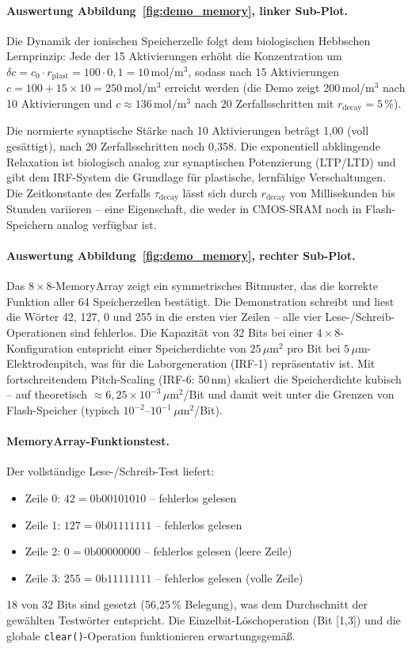 ﻿\documentclass[a4paper,12pt]{scrreprt}
\theoremstyle{definition}
\begin{document}
\paragraph{Auswertung Abbildung~\ref{fig:demo_memory}, linker Sub-Plot.}
Die Dynamik der ionischen Speicherzelle folgt dem biologischen Hebbschen
Lernprinzip: Jede der 15 Aktivierungen erhöht die Konzentration um
$\delta c = c_0 \cdot r_\text{plast} = 100 \cdot 0{,}1 = 10$\,mol/m$^3$,
sodass nach 15 Aktivierungen $c = 100 + 15 \times 10 = 250$\,mol/m$^3$ erreicht
werden (die Demo zeigt 200\,mol/m$^3$ nach 10 Aktivierungen und $c \approx 136$\,mol/m$^3$
nach 20 Zerfallsschritten mit $r_\text{decay} = 5$\,\%).

Die normierte synaptische Stärke nach 10 Aktivierungen beträgt 1,00 (voll gesättigt),
nach 20 Zerfallsschritten noch 0,358. Die exponentiell abklingende Relaxation
ist biologisch analog zur synaptischen Potenzierung (LTP/LTD) und gibt dem
IRF-System die Grundlage für plastische, lernfähige Verschaltungen. Die
Zeitkonstante des Zerfalls $\tau_\text{decay}$ lässt sich durch $r_\text{decay}$
von Millisekunden bis Stunden variieren -- eine Eigenschaft, die weder in
CMOS-SRAM noch in Flash-Speichern analog verfügbar ist.

\paragraph{Auswertung Abbildung~\ref{fig:demo_memory}, rechter Sub-Plot.}
Das $8 \times 8$-MemoryArray zeigt ein symmetrisches Bitmuster, das die korrekte
Funktion aller 64 Speicherzellen bestätigt. Die Demonstration schreibt und liest
die Wörter 42, 127, 0 und 255 in die ersten vier Zeilen -- alle vier
Lese-/Schreib-Operationen sind fehlerlos. Die Kapazität von 32 Bits bei einer
$4 \times 8$-Konfiguration entspricht einer Speicherdichte von $25\,\mu\text{m}^2$
pro Bit bei $5\,\mu\text{m}$-Elektrodenpitch, was für die Laborgeneration
(IRF-1) repräsentativ ist. Mit fortschreitendem Pitch-Scaling (IRF-6: 50\,nm)
skaliert die Speicherdichte kubisch -- auf theoretisch $\approx 6{,}25 \times 10^{-3}\,\mu\text{m}^2$/Bit
und damit weit unter die Grenzen von Flash-Speicher (typisch $10^{-2}$--$10^{-1}\,\mu\text{m}^2$/Bit).

\paragraph{MemoryArray-Funktionstest.}
Der vollständige Lese-/Schreib-Test liefert:
\begin{itemize}
	\item Zeile 0: $42 = 0\text{b}00101010$ -- fehlerlos gelesen
	\item Zeile 1: $127 = 0\text{b}01111111$ -- fehlerlos gelesen
	\item Zeile 2: $0 = 0\text{b}00000000$ -- fehlerlos gelesen (leere Zeile)
	\item Zeile 3: $255 = 0\text{b}11111111$ -- fehlerlos gelesen (volle Zeile)
\end{itemize}
18 von 32 Bits sind gesetzt (56,25\,\% Belegung), was dem Durchschnitt der
gewählten Testwörter entspricht. Die Einzelbit-Löschoperation (Bit [1,3])
und die globale \texttt{clear()}-Operation funktionieren erwartungsgemäß.
\end{document}
